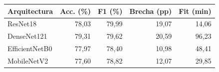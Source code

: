 \begin{tabular}{@{}lrrrr@{}}
\toprule
\textbf{Arquitectura} & \textbf{Acc. (\%)} & \textbf{F1 (\%)} & \textbf{Brecha (pp)} & \textbf{Fit (min)} \\
\midrule
ResNet18 & 78,03 & 79,99 & 19,07 & 14,06 \\
DenseNet121 & 79,31 & 79,62 & 20,59 & 96,23 \\
EfficientNetB0 & 77,97 & 78,40 & 10,98 & 48,41 \\
MobileNetV2 & 77,60 & 78,82 & 12,07 & 29,85 \\
\bottomrule
\end{tabular}
